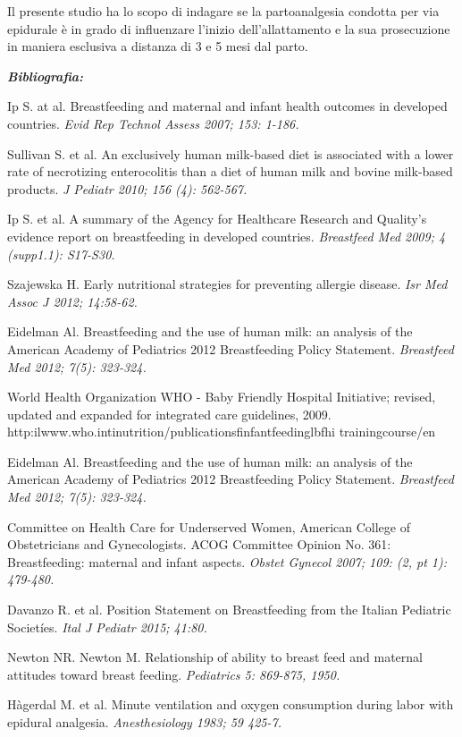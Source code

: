 \documentclass[]{article}
\begin{document}
Il presente studio ha lo scopo di indagare se la partoanalgesia condotta
per via epidurale è in grado di influenzare l'inizio dell'allattamento e
la sua prosecuzione in maniera esclusiva a distanza di 3 e 5 mesi dal
parto.

\emph{\textbf{Bibliografia:}}

Ip S. at al. Breastfeeding and maternal and infant health outcomes in
developed countries. \emph{Evid Rep Technol Assess 2007; 153: 1-186.}

Sullivan S. et al. An exclusively human milk-based diet is associated
with a lower rate of necrotizing enterocolitis than a diet of human milk
and bovine milk-based products. \emph{J Pediatr 2010; 156 (4): 562-567.}

Ip S. et al. A summary of the Agency for Healthcare Research and
Quality's evidence report on breastfeeding in developed countries.
\emph{Breastfeed Med 2009; 4 (supp1.1): S17-S30.}

Szajewska H. Early nutritional strategies for preventing allergie
disease. \emph{Isr Med Assoc J 2012; 14:58-62.}

Eidelman Al. Breastfeeding and the use of human milk: an analysis of the
American Academy of Pediatrics 2012 Breastfeeding Policy Statement.
\emph{Breastfeed Med 2012; 7(5): 323-324.}

World Health Organization WHO - Baby Friendly Hospital Initiative;
revised, updated and expanded for integrated care guidelines, 2009.\\
http:ilwww.who.intinutrition/publicationsfinfantfeedinglbfhi
trainingcourse/en

Eidelman Al. Breastfeeding and the use of human milk: an analysis of the
American Academy of Pediatrics 2012 Breastfeeding Policy Statement.
\emph{Breastfeed Med 2012; 7(5): 323-324.}

Committee on Health Care for Underserved Women, American College of
Obstetricians and Gynecologists. ACOG Committee Opinion No. 361:
Breastfeeding: maternal and infant aspects. \emph{Obstet Gynecol 2007;
109: (2, pt 1): 479-480.}

Davanzo R. et al. Position Statement on Breastfeeding from the Italian
Pediatric Societíes. \emph{Ital J Pediatr 2015; 41:80.}

Newton NR. Newton M. Relationship of ability to breast feed and maternal
attitudes toward breast feeding. \emph{Pediatrics 5: 869-875, 1950.}

Hàgerdal M. et al. Minute ventilation and oxygen consumption during
labor with epidural analgesia. \emph{Anesthesiology 1983; 59 425-7.}
\end{document}
